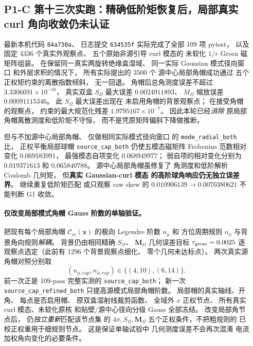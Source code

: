 \subsection{P1-C 第十三次实跑：精确低阶矩恢复后，局部真实 curl 角向收敛仍未认证}
\label{sec:p1-c-real-curl-cap-angular-order-convergence}
最新本机代码 \texttt{84a730a}、
日志提交 \texttt{634535f}
实际完成了全部 109 项 pytest，
以及固定 4336 个真实外观察点、
五个原始非源引导 curl 模态的
未软化 $1/r$ Green 磁矩阵组装。
在保留同一真实两旋转绝缘盒湿域、
同一实际 Gaussian 模式径向窗口
和外层求积的情况下，
所有实际提出的 3500 个
源中心局部角帽成功通过
五个正权矩约束的离散指数倾斜，
无一回退。
角帽后总角测度误差不超过
$3.3306691\times10^{-16}$，
真实双盒 $S_\Omega$ 最大误差
$0.0024911893$、
$M_\Omega$ 缩放误差
$0.00091115346$。
此 $S_\Omega$ 最大误差出现在
未启用角帽的背景观察点；
在接受角帽的观察点，
约束的最大规范化残差
$1.9795167\times10^{-7}$。
因此本轮已经\emph{消除}
原局部角帽离散测度和低阶矩不守恒，
而不是凭原矩阵偏斜下降做推断。

但与不加源中心局部角帽、
仅做相同实际模式径向窗口
的 \texttt{mode\_radial\_both} 比，
正权平衡局部球帽
\texttt{source\_cap\_both}
仍使五模态磁矩阵
Frobenius 范数相对变化
$0.069583991$，
最强模态自项变化
$0.068949977$；
弱自项的相对变化分别为
$0.019371613$ 和
$0.065840788$。
源中心局部角帽虽修复了
角测度和低阶解析 Coulomb 几何矩，
但\textbf{真实 Gaussian-curl 模态
的高阶球角响应仍无独立误差界}。
继续重复低阶矩匹配
或只观察 raw skew 的
$0.010906139\to0.0070380621$
不能判断 G1 收敛。

\paragraph{仅改变局部模式角帽 Gauss 阶数的单轴验证。}
把现有每个局部角帽
$\mathcal C_m(\bm x)$ 的极向
Legendre 阶数 $n_\mu$ 和
方位周期规则 $n_\phi$
与背景角向规则\emph{解耦}。
背景仍由相同精确 $S_\Omega$、
$\bm M_\Omega$ 几何误差目标
$\tau_{\rm geom}=0.0025$
逐观察点选定（此前有
1296 个背景观察点细化、
零个几何未达标点）。
两次真实源角帽对照分别取
\[
 (n_{\mu,\mathrm{cap}},n_{\phi,\mathrm{cap}})
 \in\{(4,10),(6,14)\}.
\]
前一次正是 109-pass 完整实测的
\texttt{source\_cap\_both}；
新一次
\texttt{source\_cap\_refined\_both}
只提高源模式局部角帽阶数。
局部帽的真实轴线、开角、
每点是否启用帽、
原双盒湿射线裁剪函数、
全域外 $x$ 正权节点、
所有真实 curl 模态、未软化原核
和贴壁/源中心径向分级 Gauss
全部冻结。
改变局部角节点后，
仍\emph{独立重新}匹配该节点集
的 $4\pi,S_\Omega,\bm M_\Omega$
五个正权条件，不把粗规则的
已校正权重用于细规则节点。
这是保证单轴试验中
几何测度误差不会再次混淆
电流加权角向变化的必要条件。

